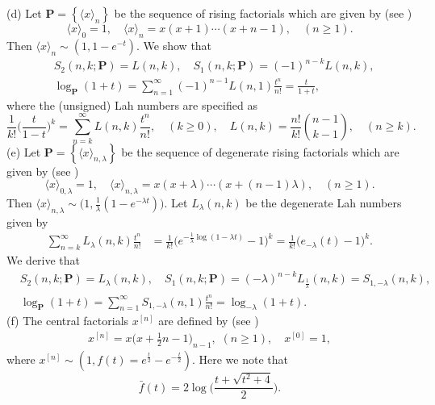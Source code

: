 \documentclass[a4paper,11pt]{amsart}
\begin{document}
(d) Let $\mathbf{P}=\left\{\langle{x \rangle}_{n}\right\}$ be the sequence of rising factorials which are given by (see \cite{5,11,24,25})
\begin{equation*}
\langle x \rangle_{0}=1,\quad \langle x \rangle_{n}=x(x+1)\cdots(x+n-1),\quad(n \ge 1).
\end{equation*}
Then $\langle{x \rangle}_{n} \sim (1, 1-e^{-t})$. We show that
\begin{align*}
&S_{2}(n,k;\mathbf{P})=L(n,k), \quad S_{1}(n,k;\mathbf{P})=(-1)^{n-k}L(n,k), \\
&\log_{\mathbf{P}}(1+t)=\sum_{n=1}^{\infty}(-1)^{n-1}L(n,1)\frac{t^{n}}{n!}=\frac{t}{1+t},
\end{align*}
where the (unsigned) Lah numbers are specified as
\begin{equation*}
\frac{1}{k!}\Big(\frac{t}{1-t}\Big)^{k}=\sum_{n=k}^{\infty}L(n,k)\frac{t^{n}}{n!}, \quad (k \ge 0),\quad L(n,k)=\frac{n!}{k!}\binom{n-1}{k-1},\quad (n \ge k).
\end{equation*}
(e) Let $\mathbf{P}=\left\{\langle x \rangle_{n,\lambda}\right\}$ be the sequence of degenerate rising factorials which are given by (see \cite{13})
\begin{equation*}
\langle x \rangle_{0,\lambda}=1,\quad \langle x \rangle_{n,\lambda}=x(x+\lambda)\cdots(x+(n-1)\lambda),\quad(n \ge 1).
\end{equation*}
Then $\langle{x \rangle}_{n,\lambda} \sim \big(1, \frac{1}{\lambda}(1-e^{-\lambda t})\big)$. Let $L_{\lambda}(n,k)$ be the degenerate Lah numbers given by
\begin{align*}
\sum_{n=k}^{\infty}L_{\lambda}(n,k)\frac{t^{n}}{n!}&=\frac{1}{k!}\big(e^{-\frac{1}{\lambda}\log (1-\lambda t)}-1\big)^{k}=\frac{1}{k!}\big(e_{-\lambda}(t)-1\big)^{k}.
\end{align*}
We derive that
\begin{align*}
&S_{2}(n,k;\mathbf{P})=L_{\lambda}(n,k), \quad S_{1}(n,k;\mathbf{P})=(-\lambda)^{n-k}L_{\frac{1}{\lambda}}(n,k)=S_{1,-\lambda}(n,k), \\
& \log_{\mathbf{P}}(1+t)=\sum_{n=1}^{\infty}S_{1,-\lambda}(n,1)\frac{t^{n}}{n!}=\log_{-\lambda}(1+t).
\end{align*}
(f) The central factorials $x^{[n]}$ are defined by (see \cite{4,5,25})
\begin{align*}
x^{[n]}=x\big(x+\frac{1}{2}n-1\big)_{n-1}, \,\,(n \ge 1),\quad x^{[0]}=1,
\end{align*}
where $x^{[n]} \sim (1, f(t)=e^{\frac{t}{2}}-e^{-\frac{t}{2}})$. Here we note that
\begin{equation*}
\bar{f}(t)=2\log\bigg(\frac{t+\sqrt{t^{2}+4}}{2}\bigg).
\end{equation*}
\end{document}
